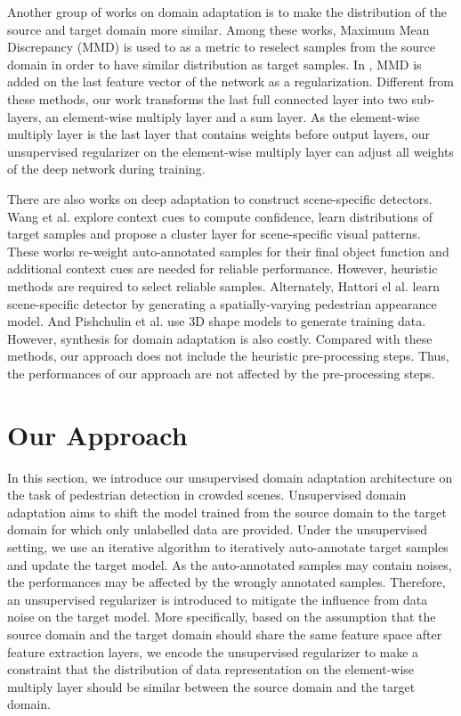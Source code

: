 \documentclass[runningheads]{llncs}
\begin{document}
Another group of works \cite{huang2006correcting,gretton2009covariate,gong2013connecting,ghifary2014domain} on domain adaptation is to make the distribution of the source and target domain more similar. Among these works, Maximum Mean Discrepancy (MMD)\cite{gretton2006kernel} is used to as a metric to reselect samples from the source domain in order to have similar distribution as target samples. In \cite{tzeng2014deep}, MMD is added on the last feature vector of the network as a regularization. Different from these methods, our work transforms the last full connected layer into two sub-layers, an element-wise multiply layer and a sum layer. As the element-wise multiply layer is the last layer that contains weights before output layers, our unsupervised regularizer on the element-wise multiply layer can adjust all weights of the deep network during training.

There are also works on deep adaptation to construct scene-specific detectors. Wang et al.\cite{wang2014scene} explore context cues to compute confidence, \cite{zeng2014deep} learn distributions of target samples and propose a cluster layer for scene-specific visual patterns. These works re-weight auto-annotated samples for their final object function and additional context cues are needed for reliable performance. However, heuristic methods are required to select reliable samples. Alternately, Hattori el al. \cite{hattori2015learning} learn scene-specific detector by generating a spatially-varying pedestrian appearance model. And Pishchulin et al. \cite{pishchulin2011learning} use 3D shape models to generate training data. However, synthesis for domain adaptation is also costly. Compared with these methods, our approach does not include the heuristic pre-processing steps. Thus, the performances of our approach are not affected by the pre-processing steps.


\section{Our Approach}
\label{section:Our Approach}

In this section, we introduce our unsupervised domain adaptation architecture on the task of pedestrian detection in crowded scenes. Unsupervised
domain adaptation aims to shift the model trained from the source domain to the target domain for which only unlabelled data are provided. Under the unsupervised setting, we use an iterative algorithm to iteratively auto-annotate target samples and update the target model. As the auto-annotated samples may contain noises, the performances may be affected by the wrongly annotated samples. Therefore, an unsupervised regularizer is introduced to mitigate the influence from data noise on the target model. More specifically, based on the assumption that the source domain and the target domain should share the same feature space after feature extraction layers, we encode the unsupervised regularizer to make a constraint that the distribution of data representation on the element-wise multiply layer should be similar between the source domain and the target domain.
\end{document}
